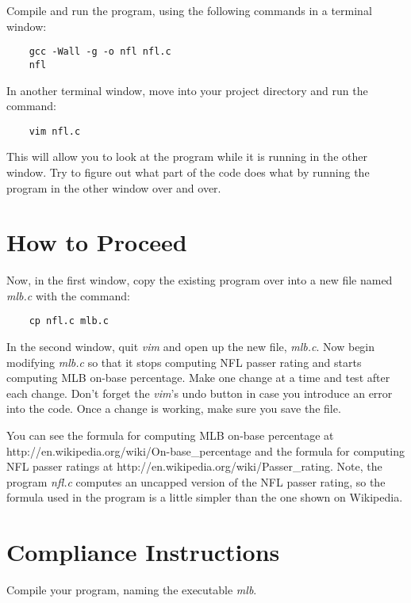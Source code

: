 \documentclass[12pt]{article}
\begin{document}
Compile and run the program, using the following commands in a terminal
window:

\begin{verbatim}
    gcc -Wall -g -o nfl nfl.c
    nfl
\end{verbatim}

In another terminal window, move into your project directory and run
the command:

\begin{verbatim}
    vim nfl.c
\end{verbatim}

This will allow you to look at the program while it is running in the
other window.
Try to figure out what part of the code does what by running the program
in the other window over and over.

\section*{How to Proceed}

Now, in the first window,
copy the existing program over into a new file named {\it mlb.c}
with the command:

\begin{verbatim}
    cp nfl.c mlb.c
\end{verbatim}

In the second window, quit {\it vim} and open up the new file, {\it mlb.c}.
Now begin modifying {\it mlb.c} so that it stops computing 
NFL passer rating
and starts computing
MLB on-base percentage.
Make one change at a time and test after each change.
Don't forget the {\it vim}'s undo button in case you introduce an error
into the code. Once a change is working, make sure you save the file.

You can see the formula for computing MLB on-base percentage
at
{http://en.wikipedia.org/wiki/On-base\_percentage}
and the formula for computing NFL passer ratings
at
{http://en.wikipedia.org/wiki/Passer\_rating}.
Note, the program {\it nfl.c} computes an uncapped version of the NFL 
passer rating, so the formula used in the program is a little simpler
than the one shown on Wikipedia.

\section*{Compliance Instructions}

Compile your program, naming the executable {\it mlb}.
\end{document}

